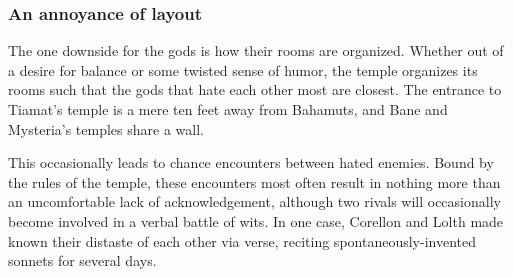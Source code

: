 \begin{multicols}{2}
\subsubsection{An annoyance of layout}
The one downside for the gods is how their rooms are organized.
Whether out of a desire for balance or some twisted sense of humor, the temple organizes its rooms such that the gods that hate each other most are closest.
The entrance to Tiamat's temple is a mere ten feet away from Bahamuts, and Bane and Mysteria's temples share a wall.

This occasionally leads to chance encounters between hated enemies.
Bound by the rules of the temple, these encounters most often result in nothing more than an uncomfortable lack of acknowledgement, although two rivals will occasionally become involved in a verbal battle of wits.
In one case, Corellon and Lolth made known their distaste of each other via verse, reciting spontaneously-invented sonnets for several days.

\end{multicols}
